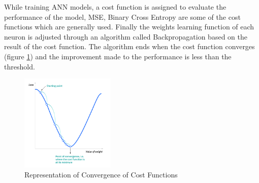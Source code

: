 \documentclass[twoside,11pt,a4paper]{article}
\begin{document}
While training \acs{ANN} models, a cost function is assigned to evaluate the performance of the model, \acf{MSE}, Binary Cross Entropy are some of the cost functions which are generally used. Finally the weights learning function of each neuron is adjusted through an algorithm called Backpropagation based on the result of the cost function. The algorithm ends when the cost function converges (figure \ref{fig:cost_function}) and the improvement made to the performance is less than the threshold.\\
\begin{figure}[ht]
	\centering
	\includegraphics[width=0.4\textwidth]{cost_function}
	\caption[Representation of Convergence of Cost Functions]{Representation of Convergence of Cost Functions\citep{ibm2022neural}}
	\label{fig:cost_function}
\end{figure}
\FloatBarrier
\end{document}
